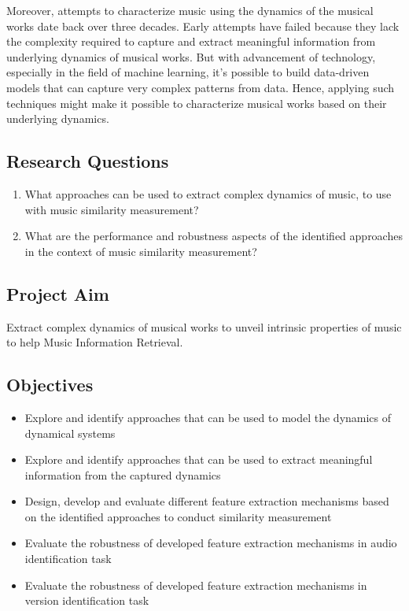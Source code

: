 \documentclass[../main.tex]{subfiles}
\begin{document}
\par
Moreover, attempts to characterize music using the dynamics of the musical works date back over three decades. Early attempts have failed because they lack the complexity required to capture and extract meaningful information from underlying dynamics of musical works. But with advancement of technology, especially in the field of machine learning, it's possible to build data-driven models that can capture very complex patterns from data. Hence, applying such techniques might make it possible to characterize musical works based on their underlying dynamics.


\subsection{Research Questions}

\normalsize
\begin{enumerate}
  \item What approaches can be used to extract complex dynamics of music, to use with music similarity measurement?
  \item What are the performance and robustness aspects of the identified approaches in the context of music similarity measurement?
\end{enumerate}

\subsection{Project Aim}
Extract complex dynamics of musical works to unveil intrinsic properties of music to help Music Information Retrieval.


\subsection{Objectives}
\begin{itemize}
  \item Explore and identify approaches that can be used to model the dynamics of dynamical systems
  \item Explore and identify approaches that can be used to extract meaningful information from the captured dynamics
  \item Design, develop and evaluate different feature extraction mechanisms based on the identified approaches to conduct similarity measurement
  \item Evaluate the robustness of developed feature extraction mechanisms in audio identification task
  \item Evaluate the robustness of developed feature extraction mechanisms in version identification task
\end{itemize}
\end{document}
